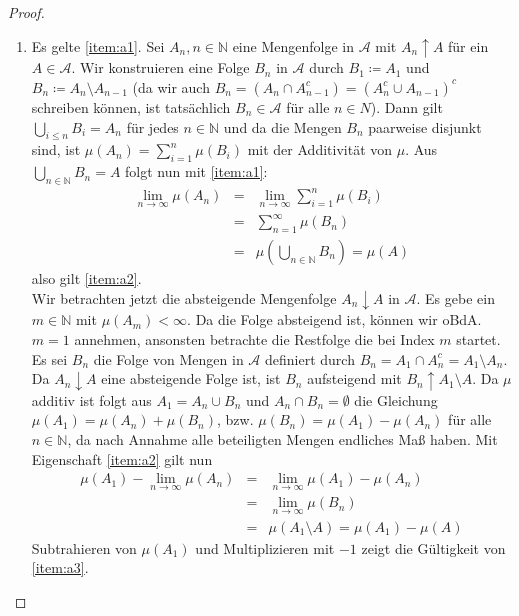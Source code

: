 \documentclass[11pt]{amsart}
\begin{document}
\begin{proof} $\;$
\begin{enumerate}[label=(\alph{enumi})]
\setlength\parindent{0pt}
\item Es gelte \ref{item:a1}. Sei $A_n, n \in \mathbb{N}$ eine Mengenfolge in $\mathcal{A}$ mit $A_n \uparrow A$ für ein $A \in \mathcal{A}$. Wir konstruieren eine Folge $B_n$ in $\mathcal{A}$ durch $B_1 \coloneqq A_1$ und $B_n \coloneqq A_n \setminus A_{n-1}$ (da wir auch $B_n = (A_{n} \cap A_{n-1}^c) = (A_{n}^c \cup A_{n-1})^c$ schreiben können, ist tatsächlich $B_n \in \mathcal{A}$ für alle $n \in N$). Dann gilt $\bigcup_{i \leq n} B_i = A_n$ für jedes $n \in \mathbb{N}$ und da die Mengen $B_n$ paarweise disjunkt sind, ist  $\mu(A_n) = \sum_{i=1}^n \mu(B_i)$ mit der Additivität von $\mu$. Aus $\bigcup_{n \in \mathbb{N}} B_n = A$ folgt nun mit \ref{item:a1}:
\begin{eqnarray*}
\lim_{n \rightarrow \infty} \mu(A_n) &=& \lim_{n \rightarrow \infty} \sum_{i=1}^n \mu(B_i) \\ 
&=& \sum_{n=1}^\infty \mu(B_n) \\ 
&=& \mu(\bigcup_{n \in \mathbb{N}} B_n) = \mu(A)
\end{eqnarray*}
also gilt \ref{item:a2}. \\

Wir betrachten jetzt die absteigende Mengenfolge $A_n \downarrow A$ in $\mathcal{A}$. Es gebe ein $m \in \mathbb{N}$ mit $\mu(A_m) < \infty$. Da die Folge absteigend ist, können wir oBdA. $m=1$ annehmen, ansonsten betrachte die Restfolge die bei Index $m$ startet. \\
Es sei $B_n$ die Folge von Mengen in $\mathcal{A} $ definiert durch $B_n = A_1 \cap A_n^c = A_1 \setminus A_n$. Da $A_n \downarrow A$ eine absteigende Folge ist, ist $B_n$ aufsteigend mit $B_n \uparrow A_1 \setminus A$. Da $\mu$ additiv ist folgt aus $A_1 = A_n \cup B_n$ und $ A_n \cap B_n = \emptyset$ die Gleichung $\mu(A_1) = \mu(A_n) + \mu( B_n)$, bzw. $\mu( B_n) = \mu(A_1) - \mu(A_n)$ für alle $n \in \mathbb{N}$, da nach Annahme alle beteiligten Mengen endliches Maß haben. Mit Eigenschaft \ref{item:a2} gilt nun
\begin{eqnarray*}
\mu(A_1) - \lim_{n \rightarrow \infty} \mu(A_n) &=&  \lim_{n \rightarrow \infty}\mu(A_1) - \mu(A_n)  \\
&=& \lim_{n \rightarrow \infty} \mu(B_n) \\
&=& \mu( A_1 \setminus A) = \mu(A_1) - \mu(A)
\end{eqnarray*} 
Subtrahieren von $\mu(A_1)$ und Multiplizieren mit $-1$ zeigt die Gültigkeit von \ref{item:a3}. \\


\end{enumerate}
\end{proof}
\end{document}
